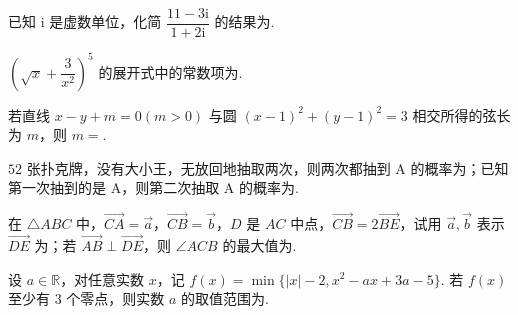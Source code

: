 \documentclass[a4paper,11pt]{report}
\begin{document}
\begin{examquestions}[start=10]

\item 已知 $\mathrm{i}$ 是虚数单位，化简 $\dfrac{11-3\mathrm{i}}{1+2\mathrm{i}}$ 的结果为\blank. 
\item $\left(\sqrt x+\dfrac3{x^2}\right)^5$ 的展开式中的常数项为\blank. 
\item 若直线 $x-y+m=0(m>0)$ 与圆 $(x-1)^2+(y-1)^2=3$ 相交所得的弦长为 $m$，则 $m=$\blank. 
\item $52$ 张扑克牌，没有大小王，无放回地抽取两次，则两次都抽到 A 的概率为\blank；已知第一次抽到的是 A，则第二次抽取 A 的概率为\blank. 
\item 在 $\triangle ABC$ 中，$\overrightarrow{CA}=\vec a$，$\overrightarrow{CB}=\vec b$，$D$ 是 $AC$ 中点，$\overrightarrow{CB}=2\overrightarrow{BE}$，试用 $\vec a,\vec b$ 表示 $\overrightarrow{DE}$ 为\blank；若 $\overrightarrow{AB}\perp\overrightarrow{DE}$，则 $\angle ACB$ 的最大值为\blank. 
\item 设 $a\in\mathbb R$，对任意实数 $x$，记 $f(x)=\min\{|x|-2,x^2-ax+3a-5\}$. 若 $f(x)$ 至少有 $3$ 个零点，则实数 $a$ 的取值范围为\blank. 

\end{examquestions}
\end{document}
